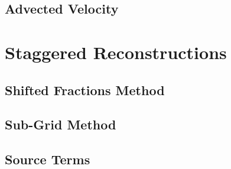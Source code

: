 
\subsection*{Advected Velocity}





\section{Staggered Reconstructions}


\subsection*{Shifted Fractions Method}


\subsection*{Sub-Grid Method}


\subsection*{Source Terms}

